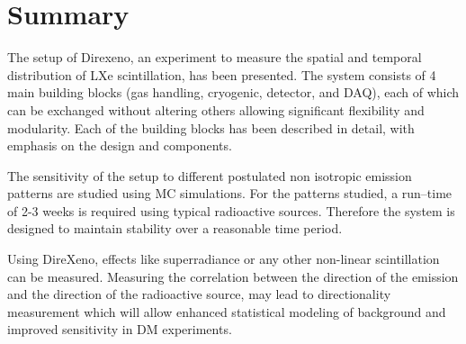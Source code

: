 \section{Summary}
\label{sec:summary}

The setup of Direxeno, an experiment to measure the spatial and temporal distribution of LXe scintillation, has 
been presented. The system consists of 4 main building blocks (gas handling, cryogenic, detector, 
and DAQ), each of which can be exchanged without altering others allowing significant flexibility 
and modularity. Each of the building blocks has been described in detail, with emphasis on the design 
and components.

The sensitivity of the setup to different postulated non isotropic emission patterns are studied using MC simulations. For the patterns studied, a run--time of 2-3 weeks is required using typical radioactive 
sources. Therefore the system is designed to maintain stability over a reasonable time period.

Using DireXeno, effects like superradiance or any other non-linear scintillation can be measured. 
Measuring the correlation between the direction of the emission and the direction of the radioactive 
source, may lead to directionality measurement which will allow enhanced statistical modeling of 
background and improved sensitivity in DM experiments.
